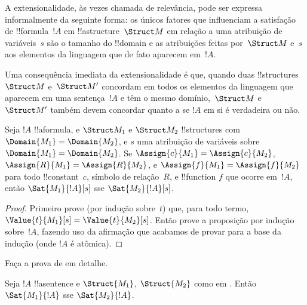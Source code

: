 \documentclass[../../../include/open-logic-section]{subfiles}
\begin{document}


\begin{explain}
A extensionalidade, às vezes chamada de relevância, pode ser expressa
informalmente da seguinte forma: os únicos fatores que influenciam a
satisfação de !!{formula}~$!A$ em !!a{structure}~$\Struct M$
em relação a uma atribuição de variáveis~$s$ são o tamanho do
!!{domain} e as atribuições feitas por~$\Struct M$ e~$s$ aos
elementos da linguagem que de fato aparecem em~$!A$.

Uma consequência imediata da extensionalidade é que, quando duas
!!{structure}s~$\Struct M$ e~$\Struct M'$ concordam em todos os elementos
da linguagem que aparecem em uma sentença~$!A$ e têm o mesmo
domínio,~$\Struct M$ e~$\Struct M'$ também devem concordar quanto a se
$!A$ em si é verdadeira ou não.
\end{explain}

\begin{prop}[Extensionalidade]
  Seja $!A$ !!a{formula}, e $\Struct M_1$ e $\Struct M_2$
  !!{structure}s com $\Domain{M_1} = \Domain{M_2}$, e $s$ uma
  atribuição de variáveis sobre $\Domain{M_1} = \Domain{M_2}$. Se
  $\Assign{c}{M_1} = \Assign{c}{M_2}$, $\Assign{R}{M_1}=\Assign{R}{M_2}$,
  e $\Assign{f}{M_1} = \Assign{f}{M_2}$ para todo !!{constant}~$c$,
  símbolo de relação~$R$, e !!{function} $f$ que ocorre em~$!A$, então
  $\Sat{M_1}{!A}[s]$ sse $\Sat{M_2}{!A}[s]$.
\end{prop}

\begin{proof}
  Primeiro prove (por indução sobre~$t$) que, para todo termo,
  $\Value{t}{M_1}[s] = \Value{t}{M_2}[s]$. Então prove a proposição
  por indução sobre~$!A$, fazendo uso da afirmação que acabamos de provar para a
  base da indução (onde $!A$ é atômica).
\end{proof}

\begin{prob}
Faça a prova de  em
detalhe.
\end{prob}

\begin{cor}
  Seja $!A$ !!a{sentence} e $\Struct{M_1}$, $\Struct{M_2}$ como em
  . Então $\Sat{M_1}{!A}$ sse $\Sat{M_2}{!A}$.
\end{cor}
\end{document}
